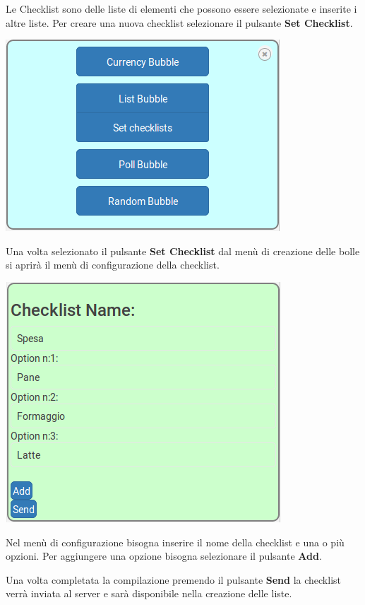 \begin{flushleft}
Le Checklist sono delle liste di elementi che possono essere selezionate e inserite i altre liste.
Per creare una nuova checklist selezionare il pulsante \textbf{Set Checklist}.\\
\begin{center}
\includegraphics[scale=0.75]{img/menu.png}
\end{center}

Una volta selezionato il pulsante \textbf{Set Checklist} dal menù di creazione delle bolle si aprirà il menù di configurazione della checklist.\\
\begin{center}
\includegraphics[scale=0.75]{img/checklist_conf.png}
\end{center}

Nel menù di configurazione bisogna inserire il nome della checklist e una o più opzioni.
Per aggiungere una opzione bisogna selezionare il pulsante \textbf{Add}.

Una volta completata la compilazione premendo il pulsante \textbf{Send} la checklist verrà inviata al server e sarà disponibile nella creazione delle liste.
\end{flushleft}

